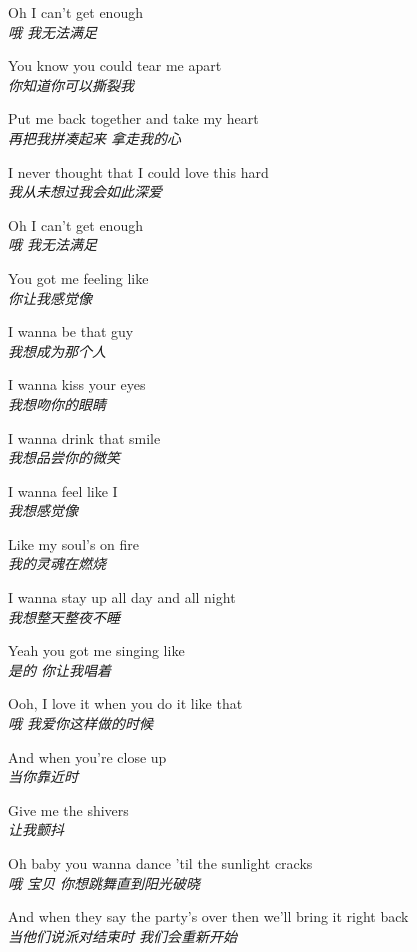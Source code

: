 \begin{spacing}{1.5}
\begin{flushleft}
Oh I can't get enough\\
\textit{哦 我无法满足}\lyricspace

You know you could tear me apart\\
\textit{你知道你可以撕裂我}\lyricspace

Put me back together and take my heart\\
\textit{再把我拼凑起来 拿走我的心}\lyricspace

I never thought that I could love this hard\\
\textit{我从未想过我会如此深爱}\lyricspace

Oh I can't get enough\\
\textit{哦 我无法满足}\lyricspace

You got me feeling like\\
\textit{你让我感觉像}\lyricspace

I wanna be that guy\\
\textit{我想成为那个人}\lyricspace

I wanna kiss your eyes\\
\textit{我想吻你的眼睛}\lyricspace

I wanna drink that smile\\
\textit{我想品尝你的微笑}\lyricspace

I wanna feel like I\\
\textit{我想感觉像}\lyricspace

Like my soul's on fire\\
\textit{我的灵魂在燃烧}\lyricspace

I wanna stay up all day and all night\\
\textit{我想整天整夜不睡}\lyricspace

Yeah you got me singing like\\
\textit{是的 你让我唱着}\lyricspace

Ooh, I love it when you do it like that\\
\textit{哦 我爱你这样做的时候}\lyricspace

And when you're close up\\
\textit{当你靠近时}\lyricspace

Give me the shivers\\
\textit{让我颤抖}\lyricspace

Oh baby you wanna dance 'til the sunlight cracks\\
\textit{哦 宝贝 你想跳舞直到阳光破晓}\lyricspace

And when they say the party's over then we'll bring it right back\\
\textit{当他们说派对结束时 我们会重新开始}\lyricspace


\end{flushleft}
\end{spacing}
